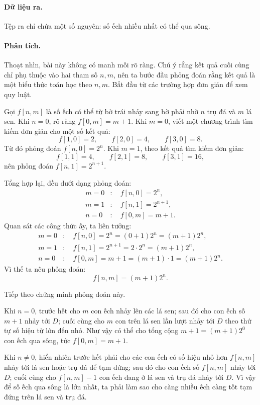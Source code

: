 \documentclass[11pt]{article}
\begin{document}
\paragraph{Dữ liệu ra.}
Tệp ra chỉ chứa một số nguyên: số ếch nhiều nhất có thể qua sông.

\paragraph{Phân tích.}
Thoạt nhìn, bài này không có manh mối rõ ràng. Chú ý rằng kết quả cuối cùng
chỉ phụ thuộc vào hai tham số \(n,m\), nên ta bước đầu phỏng đoán rằng kết
quả là một biểu thức toán học theo \(n,m\). Bắt đầu từ các trường hợp đơn
giản để xem quy luật.

Gọi \(f[n,m]\) là số ếch có thể từ bờ trái nhảy sang bờ phải nhờ \(n\) trụ đá
và \(m\) lá sen. Khi \(n=0\), rõ ràng \(f[0,m]=m+1\). Khi \(m=0\), viết một
chương trình tìm kiếm đơn giản cho một số kết quả:
\[
  f[1,0]=2,\qquad f[2,0]=4,\qquad f[3,0]=8.
\]
Từ đó phỏng đoán \(f[n,0]=2^n\). Khi \(m=1\), theo kết quả tìm kiếm đơn giản:
\[
  f[1,1]=4,\qquad f[2,1]=8,\qquad f[3,1]=16,
\]
nên phỏng đoán \(f[n,1]=2^{n+1}\).

Tổng hợp lại, đều dưới dạng phỏng đoán:
\[
\begin{aligned}
m=0&:\quad f[n,0]=2^n,\\
m=1&:\quad f[n,1]=2^{n+1},\\
n=0&:\quad f[0,m]=m+1.
\end{aligned}
\]
Quan sát các công thức ấy, ta liên tưởng:
\[
\begin{aligned}
m=0&:\quad f[n,0]=2^n=(0+1)2^n=(m+1)2^n,\\
m=1&:\quad f[n,1]=2^{n+1}=2\cdot 2^n=(m+1)2^n,\\
n=0&:\quad f[0,m]=m+1=(m+1)\cdot 1=(m+1)2^n.
\end{aligned}
\]
Vì thế ta nêu phỏng đoán:
\[
  f[n,m]=(m+1)2^n.
\]

Tiếp theo chứng minh phỏng đoán này.

Khi \(n=0\), trước hết cho \(m\) con ếch nhảy lên các lá sen; sau đó cho con
ếch số \(m+1\) nhảy tới \(D\); cuối cùng cho \(m\) con trên lá sen lần lượt
nhảy tới \(D\) theo thứ tự số hiệu từ lớn đến nhỏ. Như vậy có thể cho tổng
cộng \(m+1=(m+1)2^0\) con ếch qua sông, tức \(f[0,m]=m+1\).

Khi \(n\ne 0\), hiển nhiên trước hết phải cho các con ếch có số hiệu nhỏ hơn
\(f[n,m]\) nhảy tới lá sen hoặc trụ đá để tạm đứng; sau đó cho con ếch số
\(f[n,m]\) nhảy tới \(D\); cuối cùng cho \(f[n,m]-1\) con ếch đang ở lá sen
và trụ đá nhảy tới \(D\). Vì vậy để số ếch qua sông là lớn nhất, ta phải làm
sao cho càng nhiều ếch càng tốt tạm đứng trên lá sen và trụ đá.
\end{document}
